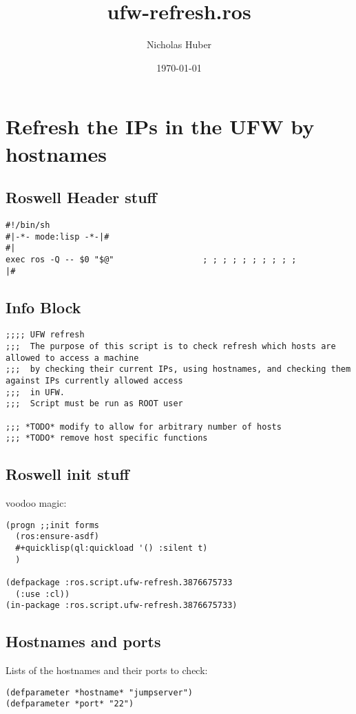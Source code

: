 \documentclass[11pt]{article}
\author{Nicholas Huber}
\date{\today}
\title{ufw-refresh.ros}
\begin{document}
\maketitle
\tableofcontents


\section{Refresh the IPs in the UFW by hostnames}
\label{sec:org9d7e9ec}
\subsection{Roswell Header stuff}
\label{sec:org7df01fb}
\begin{verbatim}
#!/bin/sh
#|-*- mode:lisp -*-|#
#|
exec ros -Q -- $0 "$@"                  ; ; ; ; ; ; ; ; ; ;
|#

\end{verbatim}

\subsection{Info Block}
\label{sec:org000e1f6}
\begin{verbatim}
;;;; UFW refresh
;;;  The purpose of this script is to check refresh which hosts are allowed to access a machine
;;;  by checking their current IPs, using hostnames, and checking them against IPs currently allowed access
;;;  in UFW.
;;;  Script must be run as ROOT user

;;; *TODO* modify to allow for arbitrary number of hosts
;;; *TODO* remove host specific functions
\end{verbatim}

\subsection{Roswell init stuff}
\label{sec:org8254316}
voodoo magic:

\begin{verbatim}
(progn ;;init forms
  (ros:ensure-asdf)
  #+quicklisp(ql:quickload '() :silent t)
  )

(defpackage :ros.script.ufw-refresh.3876675733
  (:use :cl))
(in-package :ros.script.ufw-refresh.3876675733)
\end{verbatim}

\subsection{Hostnames and ports}
\label{sec:org532d34f}
Lists of the hostnames and their ports to check:
\begin{verbatim}
(defparameter *hostname* "jumpserver")
(defparameter *port* "22")
\end{verbatim}
\end{document}
